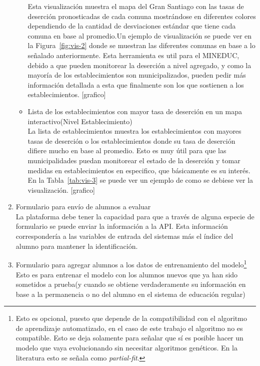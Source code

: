 \begin{enumerate}
\begin{itemize}
    Esta visualización muestra el mapa del Gran Santiago con las tasas de deserción pronosticadas de cada comuna mostrándose en diferentes colores dependiendo de la cantidad de desviaciones estándar que tiene cada comuna en base al promedio.Un ejemplo de visualización se puede ver en la Figura~\ref{fig:vis-2} donde se muestran las diferentes comunas en base a lo señalado anteriormente. Esta herramienta es util para el MINEDUC, debido a que pueden monitorear la deserción a nivel agregado, y como la mayoría de los establecimientos son municipalizados, pueden pedir más información detallada a esta que finalmente son los que sostienen a los establecimientos.
    [grafico]
    \item Lista de los establecimientos con mayor tasa de deserción en un mapa interactivo(Nivel Establecimiento) \\ \hfill
    La lista de establecimientos muestra los establecimientos con mayores tasas de deserción o los establecimientos donde su tasa de deserción difiere mucho en base al promedio. Esto es muy útil para que las municipalidades puedan monitorear el estado de la deserción y tomar medidas en establecimientos en especifico, que básicamente es su interés. En la Tabla~\ref{tab:vis-3} se puede ver un ejemplo de como se debiese ver la visualización.
    [grafico]
    \end{itemize}
\item Formulario para envío de alumnos a evaluar \\ \hfill
La plataforma debe tener la capacidad para que a través de alguna especie de formulario se puede enviar la información a la API. Esta información correspondería a las variables de entrada del sistemas más el índice del alumno para mantener la identificación.
\item Formulario para agregar alumnos a los datos de entrenamiento del modelo\footnote{Esto es opcional, puesto que depende de la compatibilidad con el algoritmo de aprendizaje automatizado, en el caso de este trabajo el algoritmo no es compatible. Esto se deja solamente para señalar que sí es posible hacer un modelo que vaya evolucionando sin necesitar algoritmos genéticos. En la literatura esto se señala como \textit{partial-fit}.} \\ \hfill
Esto es para entrenar el modelo con los alumnos nuevos que ya han sido sometidos a prueba(y cuando se obtiene verdaderamente su información en base a la permanencia o no del alumno en el sistema de educación regular)
\end{enumerate}
